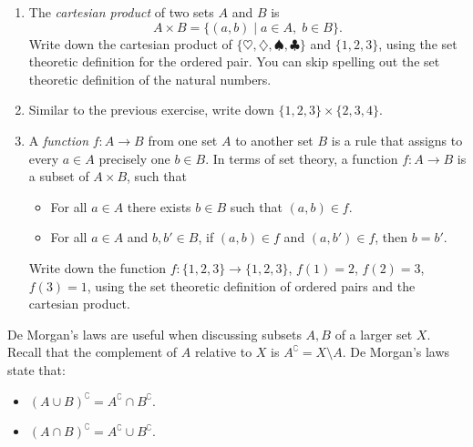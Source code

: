 \documentclass[12pt]{report}
\newenvironment{solution}%
        {%
            \ifthenelse{\isundefined{\showsolutions}}%
                    {\expandafter\comment}%
                    {\begin{mySolution}{}{}}%
                    }%
         {%
            \ifthenelse{\isundefined{\showsolutions}}%
                    {\expandafter\endcomment}%
                    {\end{mySolution}}%
          }
\begin{document}
\begin{enumerate}
    \item The \emph{cartesian product} of two sets $A$ and $B$ is 
    \begin{equation}
        A \times B = \{ (a,b) \mid a\in A, \; b\in B\}.
    \end{equation}
    Write down the cartesian product of $\{\heartsuit,\diamondsuit,\spadesuit,\clubsuit\}$ and $\{1,2,3\}$, using the set theoretic definition for the ordered pair. You can skip spelling out the set theoretic definition of the natural numbers.
    \item Similar to the previous exercise, write down $\{1,2,3\} \times \{2,3,4\}$.
    \item A \emph{function} $f: A \to B$ from one set $A$ to another set $B$ is a rule that assigns to every $a\in A$ precisely one $b\in B$. In terms of set theory, a function $f:A\to B$ is a subset of $A\times B$, such that
    \begin{itemize}
        \item For all $a\in A$ there exists $b\in B$ such that $(a,b)\in f$.
        \item For all $a \in A$ and $b,b'\in B$, if $(a,b)\in f$ and $(a,b')\in f$, then $b=b'$.
    \end{itemize}
    Write down the function $f:\{1,2,3\} \to \{1,2,3\}$, $f(1) = 2$, $f(2)=3$, $f(3)=1$, using the set theoretic definition of ordered pairs and the cartesian product.
\end{enumerate}

De Morgan's laws are useful when discussing subsets $A,B$ of a larger set $X$. Recall that the complement of $A$ relative to $X$ is $A^\complement = X \setminus A$. De Morgan's laws state that:
    \begin{itemize}
        \item $(A \cup B)^\complement = A^\complement \cap B^\complement$.
        \item $(A \cap B)^\complement = A^\complement \cup B^\complement$.
    \end{itemize}
\end{document}
